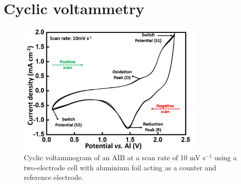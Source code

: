 \section{Cyclic voltammetry}
\begin{figure}[tbh!]
\centering
\includegraphics[width=0.8\textwidth]{Figures/chap2fig/CV}
\caption{Cyclic voltammogram of an AIB at a scan rate of 10 mV s$^{-1}$ using a two-electrode cell with aluminium foil acting as a counter and reference electrode.}
\label{Figures/chap2fig:CV}
\end{figure}

